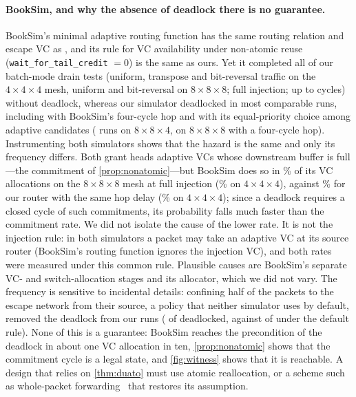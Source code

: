 \paragraph{BookSim, and why the absence of deadlock there is no guarantee.} BookSim's minimal adaptive routing function has the same routing relation and escape VC as , and its rule for VC availability under non-atomic reuse (\texttt{wait\_for\_tail\_credit} $=0$) is the same as ours. Yet it completed all  of our batch-mode drain tests (uniform, transpose and bit-reversal traffic on the $4\times4\times4$ mesh, uniform and bit-reversal on $8\times8\times8$; full injection; up to  cycles) without deadlock, whereas our simulator deadlocked in most comparable runs, including with BookSim's four-cycle hop and with its equal-priority choice among adaptive candidates ( runs on $8\times8\times4$,  on $8\times8\times8$ with a four-cycle hop). Instrumenting both simulators shows that the hazard is the same and only its frequency differs. Both grant heads adaptive VCs whose downstream buffer is full---the commitment of \cref{prop:nonatomic}---but BookSim does so in \% of its VC allocations on the $8\times8\times8$ mesh at full injection (\% on $4\times4\times4$), against \% for our router with the same hop delay (\% on $4\times4\times4$); since a deadlock requires a closed cycle of such commitments, its probability falls much faster than the commitment rate. We did not isolate the cause of the lower rate. It is not the injection rule: in both simulators a packet may take an adaptive VC at its source router (BookSim's routing function ignores the injection VC), and both rates were measured under this common rule. Plausible causes are BookSim's separate VC- and switch-allocation stages and its allocator, which we did not vary. The frequency is sensitive to incidental details: confining half of the packets to the escape network from their source, a policy that neither simulator uses by default, removed the deadlock from our runs ( of  deadlocked, against  of  under the default rule). None of this is a guarantee: BookSim reaches the precondition of the deadlock in about one VC allocation in ten, \cref{prop:nonatomic} shows that the commitment cycle is a legal state, and \cref{fig:witness} shows that it is reachable. A design that relies on \cref{thm:duato} must use atomic reallocation, or a scheme such as whole-packet forwarding~\cite{ma2012wpf} that restores its assumption.

